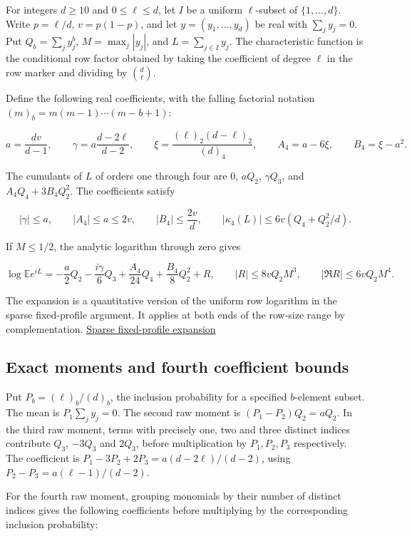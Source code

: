 \documentclass[11pt]{article}
\begin{document}
For integers $d\ge10$ and $0\le\ell\le d$, let $I$ be a uniform
$\ell$-subset of $\{1,\ldots,d\}$. Write $p=\ell/d$, $v=p(1-p)$,
and let $y=(y_1,\ldots,y_d)$ be real with $\sum_j y_j=0$.
Put $Q_b=\sum_j y_j^b$, $M=\max_j|y_j|$, and
$L=\sum_{j\in I}y_j$. The characteristic function is the
conditional row factor obtained by taking the coefficient of
degree $\ell$ in the row marker and dividing by $\binom d\ell$.

Define the following real coefficients, with the falling factorial
notation $(m)_b=m(m-1)\cdots(m-b+1)$:

\[
a=\frac{d v}{d-1},\qquad
\gamma=a\frac{d-2\ell}{d-2},\qquad
\xi=\frac{(\ell)_2(d-\ell)_2}{(d)_4},\qquad
A_4=a-6\xi,\qquad B_4=\xi-a^2 .
\]

The cumulants of $L$ of orders one through four are
$0$, $aQ_2$, $\gamma Q_3$, and $A_4Q_4+3B_4Q_2^2$.
The coefficients satisfy

\[
|\gamma|\le a,\qquad |A_4|\le a\le 2v,\qquad
|B_4|\le \frac{2v}{d},\qquad
|\kappa_4(L)|\le6v(Q_4+Q_2^2/d).
\]

If $M\le1/2$, the analytic logarithm through zero gives

\[
\log\mathbb E e^{iL}
=-\frac a2Q_2-\frac{i\gamma}{6}Q_3
+\frac{A_4}{24}Q_4+\frac{B_4}{8}Q_2^2+R,
\qquad
|R|\le 8vQ_2M^3,\qquad |\Re R|\le6vQ_2M^4 .
\]

The expansion is a quantitative version of the uniform row logarithm
in the sparse fixed-profile argument. It applies at both ends of the
row-size range by complementation. \href{https://github.com/ProgramComputer/open-math-research/blob/main/topics/balanced-arrays/eventual-all/sparse-fixed-profile-edgeworth.md\#uniform-logarithmic-expansion-for-one-row}{Sparse fixed-profile expansion}

\subsection{Exact moments and fourth coefficient bounds}

Put $P_b=(\ell)_b/(d)_b$, the inclusion probability for a specified
$b$-element subset. The mean is $P_1\sum_j y_j=0$.
The second raw moment is $(P_1-P_2)Q_2=aQ_2$.
In the third raw moment, terms with precisely one, two and three
distinct indices contribute $Q_3$, $-3Q_3$ and $2Q_3$, before
multiplication by $P_1,P_2,P_3$ respectively. The coefficient is
$P_1-3P_2+2P_3=a(d-2\ell)/(d-2)$, using
$P_2-P_3=a(\ell-1)/(d-2)$.

For the fourth raw moment, grouping monomials by their number of
distinct indices gives the following coefficients before multiplying
by the corresponding inclusion probability:
\end{document}
